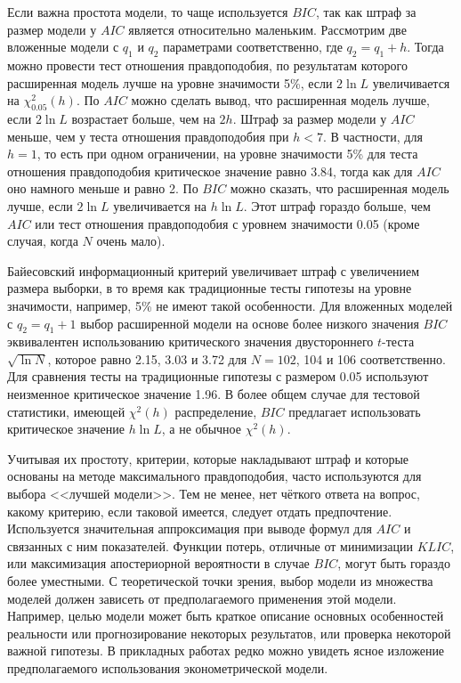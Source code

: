Если важна простота модели, то чаще используется $BIC$, так как штраф за размер модели у $AIC$ является относительно маленьким. Рассмотрим две вложенные модели с $q_1$ и $q_2$ параметрами соответственно, где $q_2 = q_1 + h$. Тогда можно провести тест отношения правдоподобия, по результатам которого расширенная модель лучше на уровне значимости 5\%, если $2\ln L$ увеличивается на $\chi_{0.05}^2(h)$. По $AIC$ можно сделать вывод, что расширенная модель лучше, если $2\ln L$ возрастает больше, чем на $2h$. Штраф за размер модели у $AIC$ меньше, чем у теста отношения правдоподобия при $h < 7$. В частности, для $h = 1$, то есть при одном ограничении, на уровне значимости 5\% для теста отношения правдоподобия критическое значение равно 3.84, тогда как для $AIC$ оно намного меньше и равно 2. По $BIC$ можно сказать, что расширенная модель лучше, если $2\ln L$ увеличивается на $h\ln L$. Этот штраф гораздо больше, чем $AIC$ или тест отношения правдоподобия с уровнем значимости 0.05 (кроме случая, когда $N$ очень мало).

Байесовский информационный критерий увеличивает штраф с увеличением размера выборки, в то время как традиционные тесты гипотезы на уровне значимости, например, 5\% не имеют такой особенности. Для вложенных моделей с $q_2 = q_1 + 1$ выбор расширенной модели на основе более низкого значения $BIC$ эквивалентен использованию критического значения двустороннего $t$-теста $\sqrt{\ln N}$, которое равно 2.15, 3.03 и 3.72 для $N = 102$, 104 и 106 соответственно. Для сравнения тесты на традиционные гипотезы с размером 0.05 используют неизменное критическое значение 1.96. В более общем случае для тестовой статистики, имеющей $\chi^2(h)$ распределение, $BIC$ предлагает использовать критическое значение $h\ln L$, а не обычное $\chi^2(h)$.

Учитывая их простоту, критерии, которые накладывают штраф и которые основаны на методе максимального правдоподобия, часто используются для выбора <<лучшей модели>>. Тем не менее, нет чёткого ответа на вопрос, какому критерию, если таковой имеется, следует отдать предпочтение. Используется значительная аппроксимация при выводе формул для $AIC$ и связанных с ним показателей. Функции потерь, отличные от минимизации $KLIC$, или максимизация апостериорной вероятности в случае $BIC$, могут быть гораздо более уместными. С теоретической точки зрения, выбор модели из множества моделей должен зависеть от предполагаемого применения этой модели. Например, целью модели может быть краткое описание основных особенностей реальности или прогнозирование некоторых результатов, или проверка некоторой важной гипотезы. В прикладных работах редко можно увидеть ясное изложение предполагаемого использования эконометрической модели.

